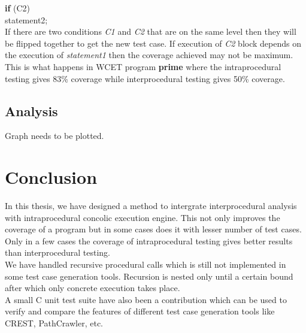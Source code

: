 \documentclass[12pt,oneside]{book}
\begin{document}
\vspace{-8mm}
\hspace{5cm}
\textbf{if} (C2)   \\

\vspace{-10mm}
\hspace{5.25cm} statement2;
\hspace{6cm}  \\

If there are two conditions \textit{C1} and \textit{C2} that are on the same level then they will be flipped together to get the new test case. If execution of \textit{C2} block depends on the execution of \textit{statement1} then the coverage achieved may not be maximum. This is what happens in WCET program \textbf{prime} where the intraprocedural testing gives 83\% coverage while interprocedural testing gives 50\% coverage.


\section{Analysis}
Graph needs to be plotted.













\chapter{Conclusion}
In this thesis, we have designed a method to intergrate interprocedural analysis with intraprocedural concolic execution engine. This not only improves the coverage of a program but in some cases does it with lesser number of test cases. Only in a few cases the coverage of intraprocedural testing gives better results than interprocedural testing.\\  
We have handled recursive procedural calls which is still not implemented in some test case generation tools. Recursion is nested only until a certain bound after which only concrete execution takes place.\\
A small C unit test suite have also been a contribution which can be used to verify and compare the features of different test case generation tools like CREST, PathCrawler, etc.  






\newpage
\end{document}
